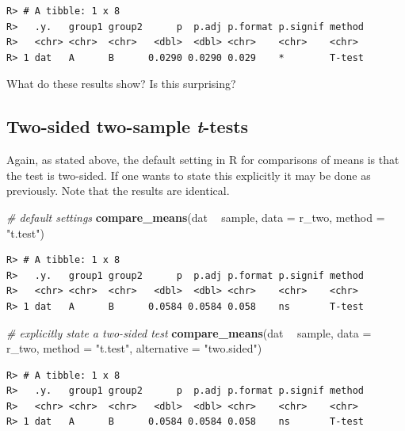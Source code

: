 \documentclass[english,10pt,a4paper,oneside]{book}
\newenvironment{Shaded}{\begin{snugshade}}{\end{snugshade}}
\newcommand{\KeywordTok}[1]{\textcolor[rgb]{0.13,0.29,0.53}{\textbf{#1}}}
\newcommand{\DataTypeTok}[1]{\textcolor[rgb]{0.13,0.29,0.53}{#1}}
\newcommand{\StringTok}[1]{\textcolor[rgb]{0.31,0.60,0.02}{#1}}
\newcommand{\CommentTok}[1]{\textcolor[rgb]{0.56,0.35,0.01}{\textit{#1}}}
\newcommand{\OperatorTok}[1]{\textcolor[rgb]{0.81,0.36,0.00}{\textbf{#1}}}
\newcommand{\NormalTok}[1]{#1}
\theoremstyle{definition}
\theoremstyle{definition}
\theoremstyle{definition}
\theoremstyle{remark}
\begin{document}
\begin{verbatim}
R> # A tibble: 1 x 8
R>   .y.   group1 group2      p  p.adj p.format p.signif method
R>   <chr> <chr>  <chr>   <dbl>  <dbl> <chr>    <chr>    <chr> 
R> 1 dat   A      B      0.0290 0.0290 0.029    *        T-test
\end{verbatim}

What do these results show? Is this surprising?

\subsection{\texorpdfstring{Two-sided two-sample
\emph{t}-tests}{Two-sided two-sample t-tests}}\label{two-sided-two-sample-t-tests}

Again, as stated above, the default setting in R for comparisons of
means is that the test is two-sided. If one wants to state this
explicitly it may be done as previously. Note that the results are
identical.

\begin{Shaded}
\begin{Highlighting}[]
\CommentTok{# default settings}
\KeywordTok{compare_means}\NormalTok{(dat }\OperatorTok{~}\StringTok{ }\NormalTok{sample, }\DataTypeTok{data =}\NormalTok{ r_two, }\DataTypeTok{method =} \StringTok{"t.test"}\NormalTok{)}
\end{Highlighting}
\end{Shaded}

\begin{verbatim}
R> # A tibble: 1 x 8
R>   .y.   group1 group2      p  p.adj p.format p.signif method
R>   <chr> <chr>  <chr>   <dbl>  <dbl> <chr>    <chr>    <chr> 
R> 1 dat   A      B      0.0584 0.0584 0.058    ns       T-test
\end{verbatim}

\begin{Shaded}
\begin{Highlighting}[]
\CommentTok{# explicitly state a two-sided test}
\KeywordTok{compare_means}\NormalTok{(dat }\OperatorTok{~}\StringTok{ }\NormalTok{sample, }\DataTypeTok{data =}\NormalTok{ r_two, }\DataTypeTok{method =} \StringTok{"t.test"}\NormalTok{, }\DataTypeTok{alternative =} \StringTok{"two.sided"}\NormalTok{)}
\end{Highlighting}
\end{Shaded}

\begin{verbatim}
R> # A tibble: 1 x 8
R>   .y.   group1 group2      p  p.adj p.format p.signif method
R>   <chr> <chr>  <chr>   <dbl>  <dbl> <chr>    <chr>    <chr> 
R> 1 dat   A      B      0.0584 0.0584 0.058    ns       T-test
\end{verbatim}
\end{document}

